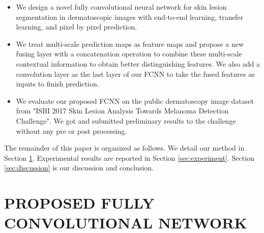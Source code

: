 \documentclass{article}
\begin{document}
\begin{itemize}
\item {We design a novel fully convolutional neural network for skin lesion segmentation in dermatoscopic images with end-to-end learning, transfer learning, and pixel by pixel prediction. }
\item{We treat multi-scale prediction maps as feature maps and propose a new fusing layer with a concatenation operation to combine these multi-scale contextual information to obtain better distinguishing features. We also add a convolution layer as the last layer of our FCNN to take the fused features as inputs to finish prediction.} 
\item{We evaluate our proposed FCNN on the public dermatoscopy image dataset from  
"ISBI 2017 Skin Lesion Analysis Towards Melanoma Detection Challenge"\cite{2017-ISBI-SkinLesionChallenge}.
 We got and submitted preliminary results to the challenge without any pre or post processing.} 
\end{itemize}       

The remainder of this paper is organized as follows. We detail our method in Section \ref{sec:method}. Experimental results are reported in Section \ref{sec:experiment}. Section \ref{sec:discussion} is our discussion and conclusion.


\section{PROPOSED FULLY CONVOLUTIONAL NETWORK}
\label{sec:method}
\end{document}
